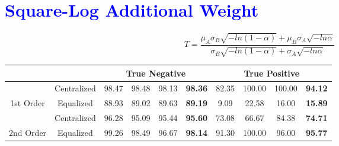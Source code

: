 \documentclass[10pt,a4paper]{article}
\begin{document}
	\section{\textcolor{blue}{Square-Log Additional Weight}}
		$$
		T = \frac{\mu_A \sigma_B \sqrt{-ln(1 - \alpha)}
			+ \mu_B \sigma_A \sqrt{-ln\alpha}}
		{\sigma_B \sqrt{-ln(1 - \alpha)} + \sigma_A \sqrt{-ln\alpha}}
		$$
		\begin{table}[!ht]
			\centering
			\begin{tabular}{|c|c|c|c|c|c|c|c|c|c|}
				\hline
				&             & \multicolumn{4}{c|}{True Negative}                            & \multicolumn{4}{c|}{True Positive}                              \\ \hline
				& Centralized & 98.47 & 98.48 & 98.13 & {\color[HTML]{FE0000} \textbf{98.36}} & 82.35 & 100.00 & 100.00 & {\color[HTML]{FE0000} \textbf{94.12}} \\ \cline{2-10} 
				\multirow{-2}{*}{1st Order} & Equalized   & 88.93 & 89.02 & 89.63 & {\color[HTML]{FE0000} \textbf{89.19}} & 9.09  & 22.58  & 16.00  & {\color[HTML]{FE0000} \textbf{15.89}} \\ \hline
				& Centralized & 96.28 & 95.09 & 95.44 & {\color[HTML]{FE0000} \textbf{95.60}} & 73.08 & 66.67  & 84.38  & {\color[HTML]{FE0000} \textbf{74.71}} \\ \cline{2-10} 
				\multirow{-2}{*}{2nd Order} & Equalized   & 99.26 & 98.49 & 96.67 & {\color[HTML]{FE0000} \textbf{98.14}} & 91.30 & 100.00 & 96.00  & {\color[HTML]{FE0000} \textbf{95.77}} \\ \hline
			\end{tabular}
		\end{table}
	
\end{document}
